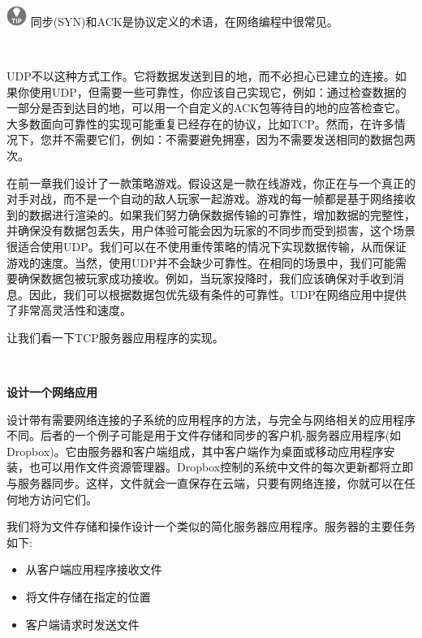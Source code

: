 \hspace*{\fill} \\ %
\includegraphics[width=0.05\textwidth]{images/tip}
同步(SYN)和ACK是协议定义的术语，在网络编程中很常见。 \par
\noindent\textbf{}\ \par

UDP不以这种方式工作。它将数据发送到目的地，而不必担心已建立的连接。如果你使用UDP，但需要一些可靠性，你应该自己实现它，例如：通过检查数据的一部分是否到达目的地，可以用一个自定义的ACK包等待目的地的应答检查它。大多数面向可靠性的实现可能重复已经存在的协议，比如TCP。然而，在许多情况下，您并不需要它们，例如：不需要避免拥塞，因为不需要发送相同的数据包两次。 \par
在前一章我们设计了一款策略游戏。假设这是一款在线游戏，你正在与一个真正的对手对战，而不是一个自动的敌人玩家一起游戏。游戏的每一帧都是基于网络接收到的数据进行渲染的。如果我们努力确保数据传输的可靠性，增加数据的完整性，并确保没有数据包丢失，用户体验可能会因为玩家的不同步而受到损害，这个场景很适合使用UDP。我们可以在不使用重传策略的情况下实现数据传输，从而保证游戏的速度。当然，使用UDP并不会缺少可靠性。在相同的场景中，我们可能需要确保数据包被玩家成功接收。例如，当玩家投降时，我们应该确保对手收到消息。因此，我们可以根据数据包优先级有条件的可靠性。UDP在网络应用中提供了非常高灵活性和速度。 \par
让我们看一下TCP服务器应用程序的实现。 \par

\noindent\textbf{}\ \par
\textbf{设计一个网络应用} \ \par
设计带有需要网络连接的子系统的应用程序的方法，与完全与网络相关的应用程序不同。后者的一个例子可能是用于文件存储和同步的客户机-服务器应用程序(如Dropbox)。它由服务器和客户端组成，其中客户端作为桌面或移动应用程序安装，也可以用作文件资源管理器。Dropbox控制的系统中文件的每次更新都将立即与服务器同步。这样，文件就会一直保存在云端，只要有网络连接，你就可以在任何地方访问它们。 \par
我们将为文件存储和操作设计一个类似的简化服务器应用程序。服务器的主要任务如下: \par

\begin{itemize}
	\item 从客户端应用程序接收文件
	\item 将文件存储在指定的位置
	\item 客户端请求时发送文件
\end{itemize}

